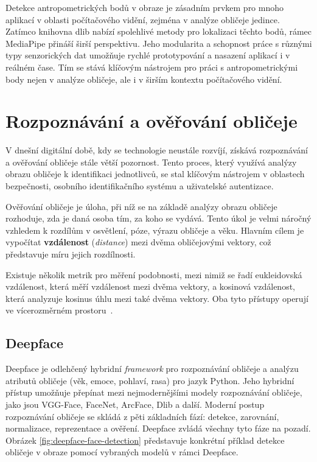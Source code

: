 \bigskip

\noindent Detekce antropometrických bodů v obraze je zásadním prvkem pro mnoho aplikací v oblasti počítačového vidění, zejména v analýze obličeje jedince. Zatímco knihovna dlib nabízí spolehlivé metody pro lokalizaci těchto bodů, rámec MediaPipe přináší širší perspektivu. Jeho modularita a schopnost práce s různými typy senzorických dat umožňuje rychlé prototypování a nasazení aplikací i v reálném čase. Tím se stává klíčovým nástrojem pro práci s antropometrickými body nejen v analýze obličeje, ale i v širším kontextu počítačového vidění.

\section{Rozpoznávání a ověřování obličeje}

V dnešní digitální době, kdy se technologie neustále rozvíjí, získává rozpoznávání a ověřování obličeje stále větší pozornost. Tento proces, který využívá analýzy obrazu obličeje k identifikaci jednotlivců, se stal klíčovým nástrojem v oblastech bezpečnosti, osobního identifikačního systému a uživatelské autentizace.

\bigskip

\noindent Ověřování obličeje je úloha, při níž se na základě analýzy obrazu obličeje rozhoduje, zda je daná osoba tím, za koho se vydává. Tento úkol je velmi náročný vzhledem k rozdílům v osvětlení, póze, výrazu obličeje a věku. Hlavním cílem je vypočítat \textbf{vzdálenost} \cite{CosineDistance} (\textit{distance}) mezi dvěma obličejovými vektory, což představuje míru jejich rozdílnosti.

Existuje několik metrik pro měření podobnosti, mezi nimiž se řadí eukleidovská vzdálenost, která měří vzdálenost mezi dvěma vektory, a kosinová vzdálenost, která analyzuje kosinus úhlu mezi také dvěma vektory. Oba tyto přístupy operují ve vícerozměrném prostoru~\cite{CosineDistance}.

\subsection*{Deepface}

Deepface \cite{serengil2020lightface} je odlehčený hybridní \textit{framework} pro rozpoznávání obličeje a analýzu atributů obličeje (věk, emoce, pohlaví, rasa) pro jazyk Python. Jeho hybridní přístup umožňuje přepínat mezi nejmodernějšími modely rozpoznávání obličeje, jako jsou VGG-Face, FaceNet, ArcFace, Dlib a další. Moderní postup rozpoznávání obličeje se skládá z pěti základních fází: detekce, zarovnání, normalizace, reprezentace a ověření. Deepface zvládá všechny tyto fáze na pozadí. Obrázek \ref{fig:deepface-face-detection} představuje konkrétní příklad detekce obličeje v obraze pomocí vybraných modelů v rámci Deepface.

